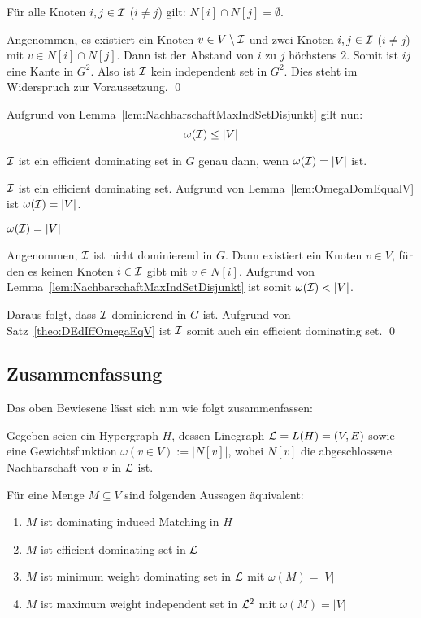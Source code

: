 \begin{Lemma}\label{lem:NachbarschaftMaxIndSetDisjunkt}
    Für alle Knoten $i,j\in\mathcal{I}$ ($i\neq j$) gilt: $N[i] \cap N[j] = \emptyset$.
\end{Lemma}

\begin{Proof}
    Angenommen, es existiert ein Knoten $v\in V\setminus \mathcal{I}$ und zwei Knoten $i,j \in \mathcal{I}$ ($i\neq j$) mit $v \in N[i]\cap N[j]$. Dann ist der Abstand von $i$ zu $j$ höchstens $2$. Somit ist $ij$ eine Kante in $G^2$. Also ist $\mathcal{I}$ kein independent set in $G^2$. Dies steht im Widerspruch zur Voraussetzung. \qed
\end{Proof}

Aufgrund von Lemma~\ref{lem:NachbarschaftMaxIndSetDisjunkt} gilt nun: \[ \omega(\mathcal{I}) \leq |V| \]

\begin{Theorem}
    $\mathcal{I}$ ist ein efficient dominating set in $G$ genau dann, wenn $\omega(\mathcal{I})=|V|$ ist.
\end{Theorem}

\begin{Proof}
    \prR $\mathcal{I}$ ist ein efficient dominating set. Aufgrund von Lemma~\ref{lem:OmegaDomEqualV} ist $\omega(\mathcal{I}) = |V|$.
    
    \prL $\omega(\mathcal{I}) = |V|$

    Angenommen, $\mathcal{I}$ ist nicht dominierend in $G$. Dann existiert ein Knoten $v \in V$, für den es keinen Knoten $i \in \mathcal{I}$ gibt mit $v \in N[i]$. Aufgrund von Lemma~\ref{lem:NachbarschaftMaxIndSetDisjunkt} ist somit $\omega(\mathcal{I}) < |V|$.

    Daraus folgt, dass $\mathcal{I}$ dominierend in $G$ ist. Aufgrund von Satz~\ref{theo:DEdIffOmegaEqV} ist $\mathcal{I}$ somit auch ein efficient dominating set.
    \qed
\end{Proof}

\subsection{Zusammenfassung}
Das oben Bewiesene lässt sich nun wie folgt zusammenfassen:
\begin{Theorem}\label{theo:EEDiffEDiffMWDiffMWIS}
    Gegeben seien ein Hypergraph $H$, dessen Linegraph $\mathcal{L}=L(H)=(V,E)$ sowie eine Gewichtsfunktion $\omega(v\in V):=|N[v]|$, wobei $N[v]$ die abgeschlossene Nachbarschaft von $v$ in $\mathcal{L}$ ist.
    
    Für eine Menge $M \subseteq V$ sind folgenden Aussagen äquivalent:
    \begin{enumerate}
        \item $M$ ist dominating induced Matching in $H$
        \item $M$ ist efficient dominating set in $\mathcal{L}$
        \item $M$ ist minimum weight dominating set in $\mathcal{L}$ mit $\omega(M) = |V|$
        \item $M$ ist maximum weight independent set in $\mathcal{L}^2$ mit $\omega(M) = |V|$
    \end{enumerate}
\end{Theorem}